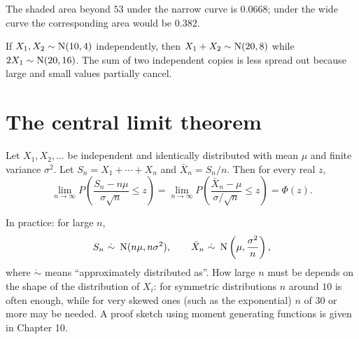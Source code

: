 \begin{center}
\end{center}
The shaded area beyond $53$ under the narrow curve is $0.0668$; under the wide curve the
corresponding area would be $0.382$.

\begin{example}
If $X_1, X_2\sim\operatorname{N}(10, 4)$ independently, then $X_1+X_2\sim\operatorname{N}(20, 8)$ while
$2X_1\sim\operatorname{N}(20, 16)$. The sum of two independent copies is less spread out because
large and small values partially cancel.
\end{example}

\section{The central limit theorem}

\begin{theorem}
Let $X_1, X_2, \dots$ be independent and identically distributed with mean $\mu$ and
finite variance $\sigma^2$. Let $S_n = X_1+\cdots+X_n$ and $\bar X_n = S_n/n$. Then for
every real $z$,
\[
  \lim_{n\to\infty}P\left(\frac{S_n - n\mu}{\sigma\sqrt n}\le z\right) =
  \lim_{n\to\infty}P\left(\frac{\bar X_n - \mu}{\sigma/\sqrt n}\le z\right) = \Phi(z).
\]
\end{theorem}

In practice: for large $n$,
\[
  S_n\ \dot\sim\ \operatorname{N}(n\mu, n\sigma^2), \qquad \bar X_n\ \dot\sim\ \operatorname{N}\left(\mu,
  \frac{\sigma^2}{n}\right),
\]
where $\dot\sim$ means ``approximately distributed as''. How large $n$ must be depends on
the shape of the distribution of $X_i$: for symmetric distributions $n$ around $10$ is
often enough, while for very skewed ones (such as the exponential) $n$ of $30$ or more may
be needed. A proof sketch using moment generating functions is given in Chapter 10.

